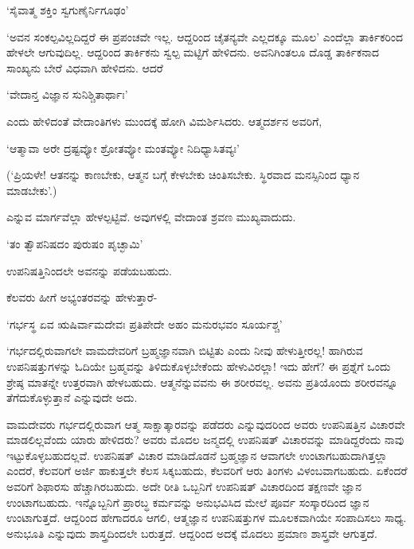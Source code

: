 \begin{shloka}
`ಸೈವಾತ್ಮ ಶಕ್ತಿಂ ಸ್ವಗುಣೈರ್ನಿಗೂಢಂ'
\end{shloka}

`ಅವನ ಸಂಕಲ್ಪವಿಲ್ಲದಿದ್ದರೆ ಈ ಪ್ರಪಂಚವೇ ಇಲ್ಲ. ಆದ್ದರಿಂದ ಚೈತನ್ಯವೇ ಎಲ್ಲದಕ್ಕೂ ಮೂಲ' ಎಂದೆಲ್ಲಾ ತಾರ್ಕಿಕರಿಂದ ಹೇಳಲೇ ಆಗುವುದಿಲ್ಲ. ಆದ್ದರಿಂದ ತಾರ್ಕಿಕನು ಸ್ವಲ್ಪ ಮಟ್ಟಿಗೆ ಹೇಳಿದನು. ಅವನಿಗಿಂತಲೂ ದೊಡ್ಡ ತಾರ್ಕಿಕನಾದ ಸಾಂಖ್ಯನು ಬೇರೆ ವಿಧವಾಗಿ ಹೇಳಿದನು. ಆದರೆ

\begin{shloka}
`ವೇದಾನ್ತ ವಿಜ್ಞಾನ ಸುನಿಶ್ಚಿತಾರ್ಥಾಃ'
\end{shloka}

ಎಂದು ಹೇಳಿದಂತೆ ವೇದಾಂತಿಗಳು ಮುಂದಕ್ಕೆ ಹೋಗಿ ವಿಮರ್ಶಿಸಿದರು. ಆತ್ಮದರ್ಶನ ಅವರಿಗೆ,

\begin{shloka}
`ಆತ್ಮಾವಾ ಅರೇ ದ್ರಷ್ಟವ್ಯೋ ಶ್ರೋತವ್ಯೋ ಮಂತವ್ಯೋ ನಿದಿಧ್ಯಾಸಿತವ್ಯಃ'
\end{shloka}

(`ಪ್ರಿಯಳೇ! ಆತನನ್ನು ಕಾಣಬೇಕು, ಆತ್ಮನ ಬಗ್ಗೆ ಕೇಳಬೇಕು ಚಿಂತಿಸಬೇಕು. ಸ್ಥಿರವಾದ ಮನಸ್ಸಿನಿಂದ ಧ್ಯಾನ ಮಾಡಬೇಕು'.)

ಎನ್ನುವ ಮಾರ್ಗವೆಲ್ಲಾ ಹೇಳಲ್ಪಟ್ಟಿವೆ. ಅವುಗಳಲ್ಲಿ ವೇದಾಂತ ಶ್ರವಣ ಮುಖ್ಯವಾದುದು.

\begin{shloka}
`ತಂ ತ್ವೌಪನಿಷದಂ ಪುರುಷಂ ಪೃಚ್ಛಾಮಿ'
\end{shloka}

ಉಪನಿಷತ್ತಿನಿಂದಲೇ ಅವನನ್ನು ಪಡೆಯಬಹುದು.

ಕೆಲವರು ಹೀಗೆ ಅಭ್ಯಂತರವನ್ನು ಹೇಳುತ್ತಾರೆ-

\begin{shloka}
`ಗರ್ಭಸ್ಥ ಏವ ಋಷಿರ್ವಾಮದೇವಃ ಪ್ರತಿಪೇದೇ ಅಹಂ ಮನುರಭವಂ ಸೂರ್ಯಶ್ಚ'
\end{shloka}

`ಗರ್ಭದಲ್ಲಿರುವಾಗಲೇ ವಾಮದೇವರಿಗೆ ಬ್ರಹ್ಮಜ್ಞಾನವಾಗಿ ಬಿಟ್ಟಿತು ಎಂದು ನೀವು ಹೇಳುತ್ತೀರಲ್ಲ! ಹಾಗಿರುವ ಉಪನಿಷತ್ತುಗಳನ್ನು ಓದಿಯೇ ಬ್ರಹ್ಮವನ್ನು ತಿಳಿದುಕೊಳ್ಳಬೇಕೆಂದು ಹೇಳುವಿರಲ್ಲಾ! ಇದು ಹೇಗೆ? ಈ ಪ್ರಶ್ನೆಗೆ ಒಂದು ಶ್ರೇಷ್ಠ ಮಾತನ್ನೇ ಉತ್ತರವಾಗಿ ಹೇಳಬಹುದು. ಆತ್ಮನೆನ್ನುವವನು ಈ ಶರೀರವಲ್ಲ. ಅವನು ಪ್ರತಿಯೊಂದು ಶರೀರವನ್ನೂ ತೆಗೆದುಕೊಳ್ಳುತ್ತಾನೆ ಎನ್ನುವುದೇ ಅದು.

ವಾಮದೇವರು ಗರ್ಭದಲ್ಲಿರುವಾಗ ಆತ್ಮ ಸಾಕ್ಷಾತ್ಕಾರವನ್ನು ಪಡೆದರು ಎನ್ನುವುದರಿಂದ ಅವರು ಉಪನಿಷತ್ತಿನ ವಿಚಾರವೇ ಮಾಡಲಿಲ್ಲವೆಂದು ಯಾರು ಹೇಳಿದರು? ಅವರು ಮೊದಲ ಜನ್ಮದಲ್ಲಿ ಉಪನಿಷತ್ ವಿಚಾರವನ್ನು ಮಾಡಿದ್ದರೆಂದು ನಾವು ಇಟ್ಟುಕೊಳ್ಳಬಹುದಲ್ಲವೆ. ಉಪನಿಷತ್ ವಿಚಾರ ಮಾಡಿದೊಡನೆ ಬ್ರಹ್ಮಜ್ಞಾನ ಆವಾಗಲೇ ಉಂಟಾಗಬಹುದಾಗಿತ್ತಲ್ಲಾ ಎಂದರೆ, ಕೆಲವರಿಗೆ ಅರ್ಜಿ ಹಾಕುತ್ತಲೇ ಕೆಲಸ ಸಿಕ್ಕಬಹುದು, ಕೆಲವರಿಗೆ ಆರು ತಿಂಗಳು ವಿಳಂಬವಾಗಬಹುದು. ಏಕೆಂದರೆ ಅವರಿಗೆ ಶಿಫಾರಸು ಹೆಚ್ಚಾಗಿರಬಹುದು. ಅದೇ ರೀತಿ ಒಬ್ಬನಿಗೆ ಉಪನಿಷತ್ ವಿಚಾರದಿಂದ ತಕ್ಷಣವೇ ಜ್ಞಾನ ಉಂಟಾಗಬಹುದು. ಇನ್ನೊಬ್ಬನಿಗೆ ಪ್ರಾರಬ್ಧ ಕರ್ಮವನ್ನು ಅನುಭವಿಸಿದ ಮೇಲೆ ಪೂರ್ವ ಸಂಸ್ಕಾರದಿಂದ ಜ್ಞಾನ ಉಂಟಾಗುತ್ತದೆ. ಆದ್ದರಿಂದ ಹೇಗಾದರೂ ಆಗಲಿ, ಆತ್ಮಜ್ಞಾನ ಉಪನಿಷತ್ತುಗಳ ಮೂಲಕವಾಗಿಯೇ ಸಂಪಾದಿಸಲು ಸಾಧ್ಯ. ಅನುಭೂತಿ ಎನ್ನುವುದು ಶಾಸ್ತ್ರದಿಂದಲೇ ಬರುತ್ತದೆ. ಆದ್ದರಿಂದ ಅದಕ್ಕೆ ಮೊದಲು ಪ್ರಮಾಣ ಶಾಸ್ತ್ರವೇ ಆಗುತ್ತದೆ.


